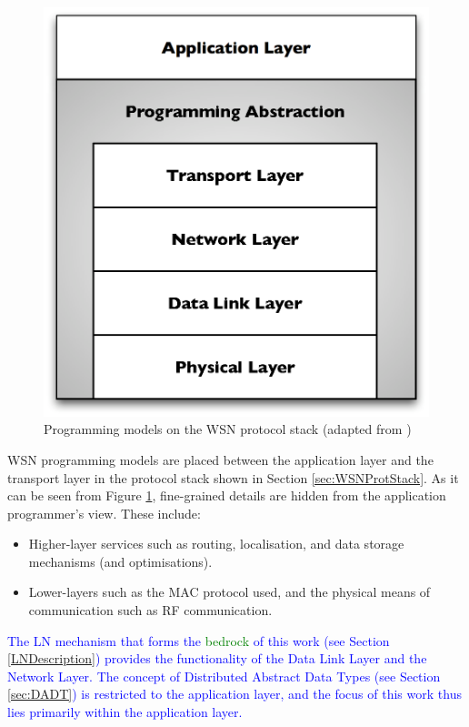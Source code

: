 \begin{figure}
\centering
\includegraphics[scale=0.61]{img/ProtStack_ProgAbstr.eps}
\caption[Programming models on the WSN protocol stack]{Programming models on the WSN protocol
stack (adapted from \cite{mottola_middleware:2008})}
\label{Fig:ProtStack_ProgAbstr}
\end{figure}

WSN programming models are placed between the application layer and the
transport layer in the
protocol stack shown in Section \ref{sec:WSNProtStack}. As it can be seen from
Figure \ref{Fig:ProtStack_ProgAbstr},
fine-grained details are hidden from the application programmer's view. These
include:

\begin{itemize}
  \item Higher-layer services such as routing, localisation, and data storage
  mechanisms (and optimisations).
  \item Lower-layers such as the MAC protocol used, and the physical means of
  communication such as RF communication.
\end{itemize}

\textcolor{blue}{The LN mechanism that forms the \textcolor{green}{bedrock} of this work (see Section \ref{LNDescription}) provides the functionality of the Data Link Layer and the Network Layer. The concept of Distributed Abstract
Data Types (see Section \ref{sec:DADT}) is restricted to the application layer, and the focus of this work thus lies primarily within the application layer.}


